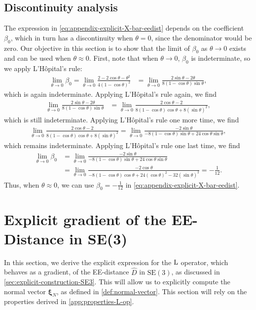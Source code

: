 \subsection{Discontinuity analysis}\label{app:discontinuity-beta-EEdist}
The expression in \eqref{eq:appendix-explicit-X-bar-eedist} depends on the coefficient $\beta_0$, which in turn has a discontinuity when $\theta=0$, since the denominator would be zero. Our objective in this section is to show that the limit of $\beta_0$ as $\theta\to 0$ exists and can be used when $\theta\approx0$. First, note that when $\theta\to 0$, $\beta_0$ is indeterminate, so we apply L'Hôpital's rule:
\begin{align}
    \lim_{\theta\to0}\beta_0=\lim_{\theta\to0} \frac{2-2\cos\theta-\theta^2}{4(1 - \cos\theta)^2}
    &= \lim_{\theta\to0} \frac{2\sin\theta-2\theta}{8(1 - \cos\theta)\sin\theta},
\end{align}
which is again indeterminate. Applying L'Hôpital's rule again, we find
\begin{align}
    \lim_{\theta\to0} \frac{2\sin\theta-2\theta}{8(1 - \cos\theta)\sin\theta}
    &= \lim_{\theta\to0} \frac{2\cos\theta-2}{8(1 - \cos\theta)\cos\theta +8(\sin\theta)^2},
\end{align}
which is still indeterminate. Applying L'Hôpital's rule one more time, we find
\begin{align}
    \lim_{\theta\to0} \frac{2\cos\theta-2}{8(1 - \cos\theta)\cos\theta +8(\sin\theta)^2} =
    \lim_{\theta\to0}\frac{-2\sin\theta}{-8(1 - \cos\theta)\sin\theta +24\cos\theta\sin\theta},
\end{align}
which remains indeterminate. Applying L'Hôpital's rule one last time, we find
\begin{align}
    \lim_{\theta\to0}\beta_0&=\lim_{\theta\to0}\frac{-2\sin\theta}{-8(1 - \cos\theta)\sin\theta +24\cos\theta\sin\theta} \\
    &=
    \lim_{\theta\to0}\frac{-2\cos\theta}{-8(1 - \cos\theta)\cos\theta +24(\cos\theta)^2-32(\sin\theta)^2} = -\frac{1}{12}.
\end{align}
Thus, when $\theta\approx0$, we can use $\beta_0=-\frac{1}{12}$ in \eqref{eq:appendix-explicit-X-bar-eedist}.

\section{Explicit gradient of the EE-Distance in SE(3)}\label{app:explicit-derivative-SE3}
In this section, we derive the explicit expression for the $\operatorname{L}$ operator, which behaves as a gradient, of the EE-distance $\widehat{D}$ in $\text{SE}(3)$, as discussed in \cref{sec:explicit-construction-SE3}. This will allow us to explicitly compute the normal vector $\boldsymbol{\xi}_N$, as defined in \cref{def:normal-vector}. This section will rely on the properties derived in \cref{app:properties-L-op}.

